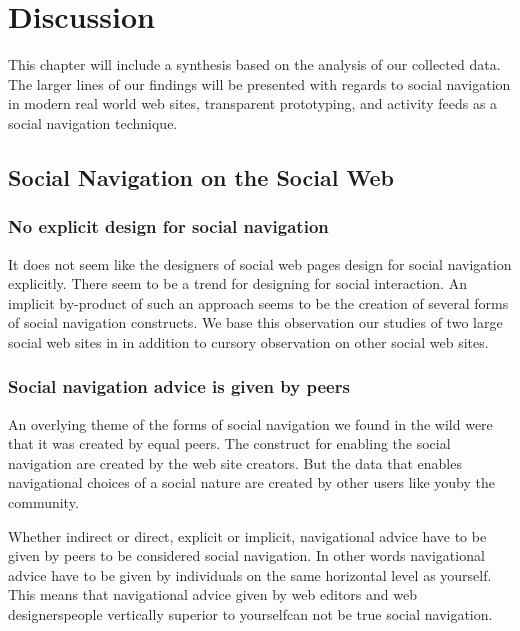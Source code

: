 \chapter{Discussion}
\label{chapter:discussion}

This chapter will include a synthesis based on the analysis of our collected
data. The larger lines of our findings will be presented with regards to
social navigation in modern real world web sites, transparent prototyping, and
activity feeds as a social navigation technique.

\section{Social Navigation on the Social Web}

\subsection{No explicit design for social navigation}

It does not seem like the designers of social web pages design for social
navigation explicitly. There seem to be a trend for designing for social
interaction. An implicit by-product of such an approach seems to be
the creation of several forms of social navigation constructs.
We base this observation our studies of two large social web sites in
 in addition to cursory observation on other social web
sites.

\subsection{Social navigation advice is given by peers}

An overlying theme of the forms of social navigation we found in the wild were
that it was created by equal peers. The construct for enabling the social
navigation are created by the web site creators. But the data that
enables navigational choices of a social nature are created by other users
like you\dash{}by the community.

Whether indirect or direct, explicit or implicit, navigational advice have to
be given by peers to be considered social navigation. In other words
navigational advice have to be given by individuals on the same horizontal
level as yourself. This means that navigational advice given by web editors
and web designers\dash{}people vertically superior to yourself\dash{}can not
be true social navigation.

